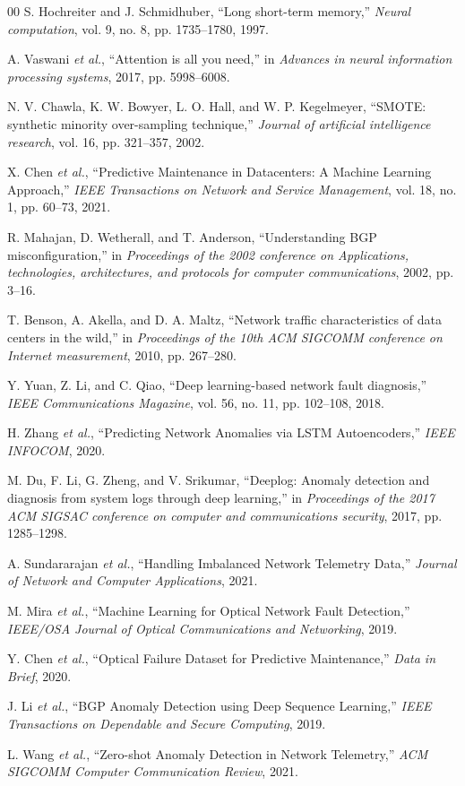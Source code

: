 \documentclass[conference]{IEEEtran}
\begin{document}
\begin{thebibliography}{00}
S. Hochreiter and J. Schmidhuber, ``Long short-term memory,'' \emph{Neural computation}, vol. 9, no. 8, pp. 1735--1780, 1997.

A. Vaswani \emph{et al.}, ``Attention is all you need,'' in \emph{Advances in neural information processing systems}, 2017, pp. 5998--6008.

N. V. Chawla, K. W. Bowyer, L. O. Hall, and W. P. Kegelmeyer, ``SMOTE: synthetic minority over-sampling technique,'' \emph{Journal of artificial intelligence research}, vol. 16, pp. 321--357, 2002.

X. Chen \emph{et al.}, ``Predictive Maintenance in Datacenters: A Machine Learning Approach,'' \emph{IEEE Transactions on Network and Service Management}, vol. 18, no. 1, pp. 60--73, 2021.

R. Mahajan, D. Wetherall, and T. Anderson, ``Understanding BGP misconfiguration,'' in \emph{Proceedings of the 2002 conference on Applications, technologies, architectures, and protocols for computer communications}, 2002, pp. 3--16.

T. Benson, A. Akella, and D. A. Maltz, ``Network traffic characteristics of data centers in the wild,'' in \emph{Proceedings of the 10th ACM SIGCOMM conference on Internet measurement}, 2010, pp. 267--280.

Y. Yuan, Z. Li, and C. Qiao, ``Deep learning-based network fault diagnosis,'' \emph{IEEE Communications Magazine}, vol. 56, no. 11, pp. 102--108, 2018.

H. Zhang \emph{et al.}, ``Predicting Network Anomalies via LSTM Autoencoders,'' \emph{IEEE INFOCOM}, 2020.

M. Du, F. Li, G. Zheng, and V. Srikumar, ``Deeplog: Anomaly detection and diagnosis from system logs through deep learning,'' in \emph{Proceedings of the 2017 ACM SIGSAC conference on computer and communications security}, 2017, pp. 1285--1298.

A. Sundararajan \emph{et al.}, ``Handling Imbalanced Network Telemetry Data,'' \emph{Journal of Network and Computer Applications}, 2021.

M. Mira \emph{et al.}, ``Machine Learning for Optical Network Fault Detection,'' \emph{IEEE/OSA Journal of Optical Communications and Networking}, 2019.

Y. Chen \emph{et al.}, ``Optical Failure Dataset for Predictive Maintenance,'' \emph{Data in Brief}, 2020.

J. Li \emph{et al.}, ``BGP Anomaly Detection using Deep Sequence Learning,'' \emph{IEEE Transactions on Dependable and Secure Computing}, 2019.

L. Wang \emph{et al.}, ``Zero-shot Anomaly Detection in Network Telemetry,'' \emph{ACM SIGCOMM Computer Communication Review}, 2021.
\end{thebibliography}
\end{document}
